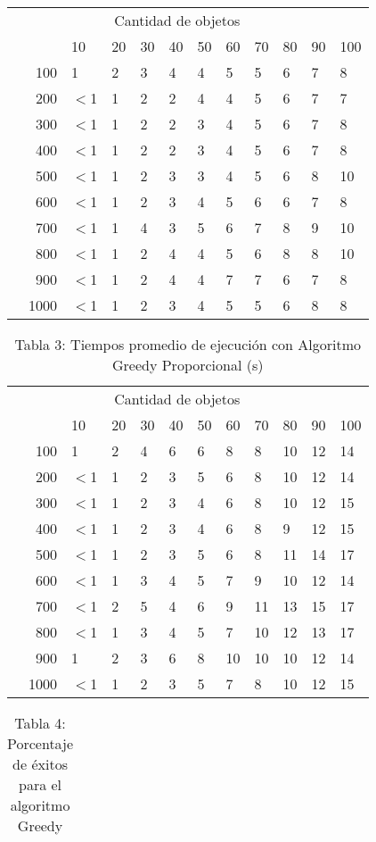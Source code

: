 \documentclass{article}
\begin{document}
\begin{center}
\begin{table}[ht]
\begin{tabularx}{0.8\textwidth}{Xr|XXXXXXXXXX}
&\multicolumn{10}{c}{Cantidad de objetos} \\
&&10&20&30&40&50&60&70&80&90&100\\\hline
\parbox[t]{2mm}{}&100&1&2&3&4&4&5&5&6&7&8\\
&200&$<$1&1&2&2&4&4&5&6&7&7\\
&300&$<$1&1&2&2&3&4&5&6&7&8\\
&400&$<$1&1&2&2&3&4&5&6&7&8\\
&500&$<$1&1&2&3&3&4&5&6&8&10\\
&600&$<$1&1&2&3&4&5&6&6&7&8\\
&700&$<$1&1&4&3&5&6&7&8&9&10\\
&800&$<$1&1&2&4&4&5&6&8&8&10\\
&900&$<$1&1&2&4&4&7&7&6&7&8\\
&1000&$<$1&1&2&3&4&5&5&6&8&8\\
\end{tabularx}
\end{table}
\begin{table}[ht]
\centering
\caption*{Tabla 3: Tiempos promedio de ejecución con Algoritmo Greedy Proporcional (\textmu s)}
\label{3}
\begin{tabularx}{0.8\textwidth}{Xr|XXXXXXXXXX}
&\multicolumn{10}{c}{Cantidad de objetos} \\
&&10&20&30&40&50&60&70&80&90&100\\\hline
\parbox[t]{2mm}{}&100&1&2&4&6&6&8&8&10&12&14\\
&200&$<$1&1&2&3&5&6&8&10&12&14\\
&300&$<$1&1&2&3&4&6&8&10&12&15\\
&400&$<$1&1&2&3&4&6&8&9&12&15\\
&500&$<$1&1&2&3&5&6&8&11&14&17\\
&600&$<$1&1&3&4&5&7&9&10&12&14\\
&700&$<$1&2&5&4&6&9&11&13&15&17\\
&800&$<$1&1&3&4&5&7&10&12&13&17\\
&900&1&2&3&6&8&10&10&10&12&14\\
&1000&$<$1&1&2&3&5&7&8&10&12&15\\
\end{tabularx}
\end{table}
\begin{table}[ht]
\centering
\caption*{Tabla 4: Porcentaje de éxitos para el algoritmo Greedy}
\label{4}
\begin{tabularx}{0.8\textwidth}{Xr|XXXXXXXXXX}

\end{tabularx}
\end{table}
\end{center}
\end{document}
